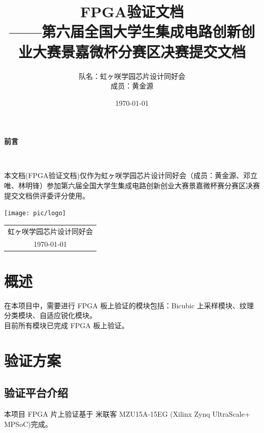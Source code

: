 \documentclass[12pt, a4paper, oneside]{ctexbook}
\title{{\Huge{\textbf{FPGA验证文档}}}\normalsize{\\——第六届全国大学生集成电路创新创业大赛景嘉微杯分赛区决赛提交文档}}
\author{队名：虹ヶ咲学园芯片设计同好会\\ 成员：黄金源\space邓立唯\space林明锋}
\date{\today}
\begin{document}
	
	\maketitle	
	\setcounter{page}{1}
	\begin{center}
		\Huge\textbf{前言}
	\end{center}~\
	
	本文档(FPGA验证文档)仅作为虹ヶ咲学园芯片设计同好会（成员：黄金源、邓立唯、林明锋）参加第六届全国大学生集成电路创新创业大赛景嘉微杯赛分赛区决赛提交文档供评委评分使用。
	~\\
	\begin{flushright}
		\texttt{[image: pic/logo]}\\
		\begin{tabular}{c}
			虹ヶ咲学园芯片设计同好会\\
			\today
		\end{tabular}
	\end{flushright}
	\newpage
	\setcounter{page}{1}
	\tableofcontents
	\newpage
	\setcounter{page}{1}
	
	\chapter{概述}
    在本项目中，需要进行 FPGA 板上验证的模块包括：Bicubic 上采样模块、纹理分类模块、自适应锐化模块。\\
    
    目前所有模块已完成 FPGA 板上验证。

    \chapter{验证方案}
    \section{验证平台介绍}
    本项目 FPGA 片上验证基于 米联客 MZU15A-15EG (Xilinx Zynq UltraScale+ MPSoC)完成。
\end{document}
